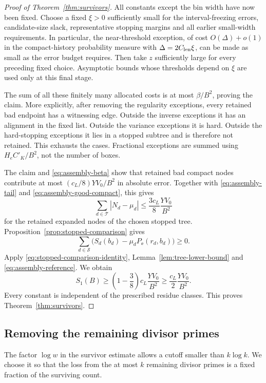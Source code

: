 \begin{proof}[Proof of Theorem~\ref{thm:survivors}]
All constants except the bin width have now been fixed. Choose a
fixed $\xi>0$ sufficiently small for the interval-freezing errors,
candidate-size slack, representative stopping margins and all
earlier small-width requirements. In particular, the near-threshold
exception, of cost $O(\Delta)+o(1)$ in the compact-history
probability measure with $\Delta=2C_{\rm len}\xi$, can be made as
small as the error budget requires. Then take $z$ sufficiently large
for every preceding fixed choice. Asymptotic bounds whose thresholds
depend on $\xi$ are used only at this final stage.

The sum of all these finitely many allocated costs is at most
$\beta/B^2$, proving the claim. More explicitly, after removing the
regularity exceptions, every retained bad endpoint has a witnessing
edge. Outside the inverse exceptions it has an alignment in the
fixed list. Outside the variance exceptions it is hard. Outside
the hard-stopping exceptions it lies in a stopped subtree and is
therefore not retained. This exhausts the cases. Fractional
exceptions are summed using $H_eC'_K/B^2$, not the number of boxes.

The claim and \eqref{eq:assembly-beta} show that retained bad compact
nodes contribute at most $(c_L/8)YV_0/B^2$ in absolute error.
Together with \eqref{eq:assembly-tail} and
\eqref{eq:assembly-good-compact}, this gives
\begin{equation}\label{eq:assembly-retained}
 \sum_{d\in\mathcal T}|N_d-\mu_d|
 \le\frac{3c_L}{8}\frac{YV_0}{B^2}
\end{equation}
for the retained expanded nodes of the chosen stopped tree.
Proposition~\ref{prop:stopped-comparison} gives
\[
 \sum_{d\in\mathcal S}
 \bigl(S_d(b_d)-\mu_dP_\ee(r_d,b_d)\bigr)\ge0.
\]
Apply \eqref{eq:stopped-comparison-identity},
Lemma~\ref{lem:tree-lower-bound} and
\eqref{eq:assembly-reference}. We obtain
\[
 S_1(B)\ge\left(1-\frac38\right)c_L\frac{YV_0}{B^2}
 \ge\frac{c_L}{2}\frac{YV_0}{B^2}.
\]
Every constant is independent of the prescribed residue classes.
This proves Theorem~\ref{thm:survivors}.
\end{proof}

\subsection{Removing the remaining divisor primes}

The factor $\log w$ in the survivor estimate allows a cutoff smaller
than $k\log k$.  We choose it so that the loss from the at most $k$
remaining divisor primes is a fixed fraction of the surviving count.

